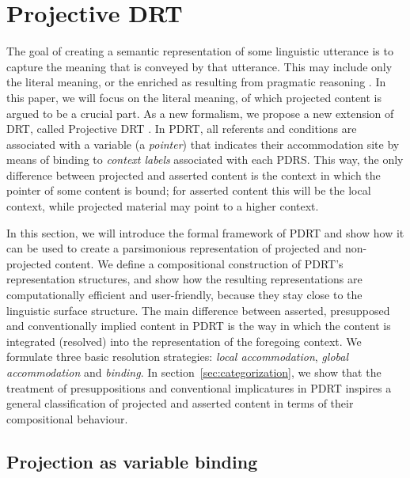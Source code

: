\section{Projective DRT}\label{sec:pdrt}

The goal of creating a semantic representation of some linguistic utterance
is to capture the meaning that is conveyed by that utterance.  This may
include only the literal meaning, or the enriched as resulting from
pragmatic reasoning \citep[cf.][]{grice1975logic}. In this paper, we will
focus on the literal meaning, of which projected content is argued to be
a crucial part.  As a new formalism, we propose a new extension of DRT,
called Projective DRT \citep[PDRT;][]{venhuizen2013pdrt}.  In PDRT, all
referents and conditions are associated with a variable (a \emph{pointer})
that indicates their accommodation site by means of binding to \emph{context
labels} associated with each PDRS. This way, the only difference between
projected and asserted content is the context in which the pointer of some
content is bound; for asserted content this will be the local context, while
projected material may point to a higher context.

In this section, we will introduce the formal framework of PDRT and show how
it can be used to create a parsimonious representation of projected and
non-projected content.  We define a compositional construction of PDRT's
representation structures, and show how the resulting representations are
computationally efficient and user-friendly, because they stay close to the
linguistic surface structure.  The main difference between asserted,
presupposed and conventionally implied content in PDRT is the way in which
the content is integrated (resolved) into the representation of the
foregoing context.  We formulate three basic resolution strategies:
\emph{local accommodation}, \emph{global accommodation} and \emph{binding}.
In section~\ref{sec:categorization}, we show that the treatment of
presuppositions and conventional implicatures in PDRT inspires a general
classification of projected and asserted content in terms of their
compositional behaviour.

\subsection{Projection as variable binding}

